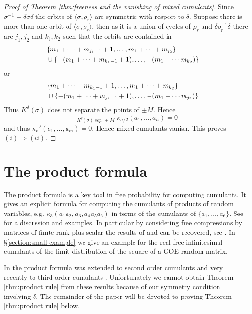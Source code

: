 \documentclass[11pt]{amsart}
\theoremstyle{definition}
\numberwithin{theorem}{section}
\newcommand{\NC}{\mathit{NC}}
\newcommand{\sep}{\mathit{\ sep.\ }}
\begin{document}
\begin{proof}[Proof of Theorem \ref{thm:freeness and the vanishing of mixed cumulants}]
Since $\sigma^{-1} = \delta \sigma \delta$ the orbits of
$\langle \sigma , \rho_r\rangle$ are symmetric with respect
to $\delta$. Suppose there is more than one orbit of
$\langle \sigma , \rho_r\rangle$, then as it is a union of
cycles of $\rho_r$ and $\delta \rho_r^{-1}\delta$ there are
$j_1, j_2$ and $k_1, k_2$ such that the orbits are contained
in
\begin{align*}\lefteqn{
\{ m_1 + \cdots + m_{j_1 -1}+1, \dots, m_1 + \cdots +m_{j_2} \}  }\\
& \mbox{} \cup \{ -(m_1 + \cdots + m_{k_1 -1}+1), \dots, -(m_1 + \cdots m_{k_2}) \}
\end{align*}
or
\begin{align*}\lefteqn{
\{ m_1 + \cdots + m_{k_1 -1}+1, \dots, m_1 + \cdots +m_{k_2} \} }\\
& \mbox{} \cup
\{ -(m_1 + \cdots + m_{j_1 -1}+1), \dots, -(m_1 + \cdots m_{j_2}) \}  
\end{align*} 
Thus $K^\delta(\sigma)$ does not separate the points of $\pm M$. Hence
\[
\mathop{\sum_{\sigma \in S_\NC^\delta(n, -n)}}_
{K^\delta(\sigma) \sep \pm M}
\kappa_{\sigma/2}(a_1, \dots, a_n) = 0
\]
and thus $\kappa_n'(a_1, \dots, a_m) = 0$. Hence mixed
cumulants vanish. This proves $(i) \Rightarrow (ii)$.
\end{proof}

\section{The product formula}\label{section:product formula}

The product formula is a key tool in free probability for
computing cumulants. It gives an explicit formula for
computing the cumulants of products of random variables,
e.g. $\kappa_3(a_1a_2, a_3, a_4 a_5 a_6)$ in terms of the
cumulants of $\{a_1, \dots, a_6\}$. See \cite[Lecture
  14]{ns} for a discussion and examples. In particular by
considering free compressions by matrices of finite rank
plus scalar the results of \cite{chs} and \cite{s} can be
recovered, see \cite[\S 5]{mt}. In \S \ref{section:small
  example} we give an example for the real free
infinitesimal cumulants of the limit distribution of the
square of a GOE random matrix.

In \cite{mst} the product formula was extended to second
order cumulants and very recently to third order cumulants
\cite{ams}. Unfortunately we cannot obtain Theorem
\ref{thm:product rule} from these results because of our
symmetry condition involving $\delta$. The remainder of the
paper will be devoted to proving Theorem \ref{thm:product
  rule} below.
\end{document}
